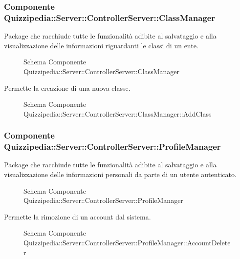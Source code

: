 \subsubsection{Componente Quizzipedia::Server::ControllerServer::ClassManager}
Package che racchiude tutte le funzionalità adibite al salvataggio e alla visualizzazione delle informazioni riguardanti le classi di un ente.
\begin{figure}[H]
\centering
\noindent{}
\caption{Schema Componente Quizzipedia::Server::ControllerServer::ClassManager}
\end{figure}
Permette la creazione di una nuova classe.
\begin{figure}[H]
\centering
\noindent{}
\caption{Schema Componente Quizzipedia::Server::ControllerServer::ClassManager::AddClass}
\end{figure}
\subsubsection{Componente Quizzipedia::Server::ControllerServer::ProfileManager}
Package che racchiude tutte le funzionalità adibite al salvataggio e alla visualizzazione delle informazioni personali da parte di un utente autenticato.
\begin{figure}[H]
\centering
\noindent{}
\caption{Schema Componente Quizzipedia::Server::ControllerServer::ProfileManager}
\end{figure}
Permette la rimozione di un account dal sistema.
\begin{figure}[H]
\centering
\noindent{}
\caption{Schema Componente Quizzipedia::Server::ControllerServer::ProfileManager::AccountDeleter}
\end{figure}

